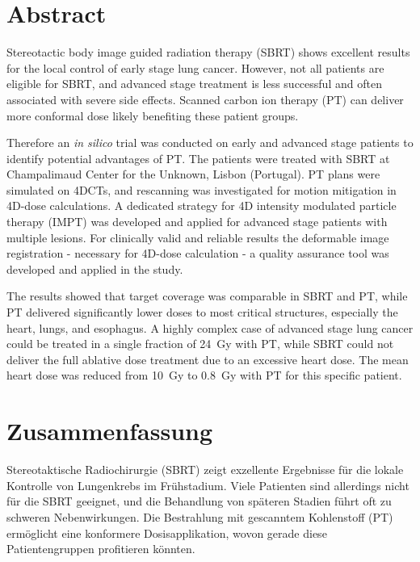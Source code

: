 \chapter*{Abstract}


Stereotactic body image guided radiation therapy (SBRT) shows excellent results for the local control of early stage lung cancer. 
However, not all patients are eligible for SBRT, and advanced stage treatment is less successful and often associated with severe side effects. 
Scanned carbon ion therapy (PT) can deliver more conformal dose likely benefiting these patient groups.

Therefore an \textit{in silico} trial was conducted on early and advanced stage patients to identify potential advantages of PT. 
The patients were treated with SBRT at Champalimaud Center for the Unknown, Lisbon (Portugal). PT plans were simulated on 4DCTs, 
and rescanning was investigated for motion mitigation in 4D-dose calculations. A dedicated strategy for 4D intensity modulated particle therapy (IMPT)
was developed and applied for advanced stage patients with multiple lesions. For clinically valid and reliable results the deformable 
image registration - necessary for 4D-dose calculation - a quality assurance tool was developed and applied in the study.

The results showed that target coverage was comparable in SBRT and PT, while PT delivered significantly lower doses to 
most critical structures, especially the heart, lungs, and esophagus. A highly complex case of advanced stage lung cancer could be treated
in a single fraction of 24~Gy with PT, while SBRT could not deliver the full ablative dose treatment due to an excessive heart dose.
The mean heart dose was reduced from 10~Gy to 0.8~Gy with PT for this specific patient.


\chapter*{Zusammenfassung}

Stereotaktische Radiochirurgie (SBRT) zeigt exzellente Ergebnisse f\"{u}r die lokale Kontrolle von 
Lungenkrebs im Fr\"{u}hstadium. Viele Patienten sind allerdings nicht f\"{u}r die SBRT geeignet, und die 
Behandlung von sp\"{a}teren Stadien f\"{u}hrt oft zu schweren Nebenwirkungen. Die Bestrahlung mit gescanntem 
Kohlenstoff (PT) erm\"{o}glicht eine konformere Dosisapplikation, wovon gerade diese Patientengruppen 
profitieren k\"{o}nnten.

